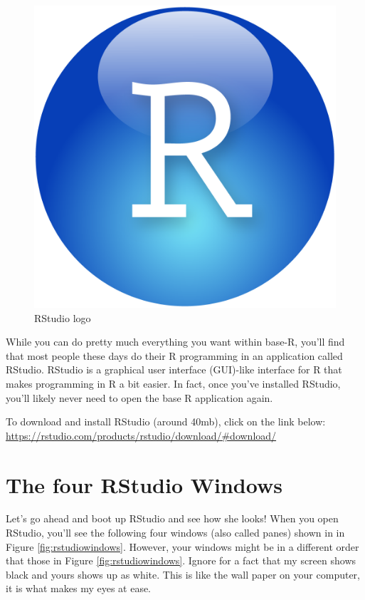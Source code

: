 \documentclass[
]{book}
\begin{document}
\begin{figure}

{\centering \includegraphics[width=0.4\linewidth]{images/chapter-1/RStudio} 

}

\caption{RStudio logo}\label{fig:rstudiologo}
\end{figure}

While you can do pretty much everything you want within base-R, you'll find that most people these days do their R programming in an application called RStudio. RStudio is a graphical user interface (GUI)-like interface for R that makes programming in R a bit easier. In fact, once you've installed RStudio, you'll likely never need to open the base R application again.

To download and install RStudio (around 40mb), click on the link below: \href{https://rstudio.com/products/rstudio/download/\#download}{https://rstudio.com/products/rstudio/download/\#download/}

\hypertarget{INSTALL-GET-FAMILIAR}{%
\section{The four RStudio Windows}\label{INSTALL-GET-FAMILIAR}}

Let's go ahead and boot up RStudio and see how she looks! When you open RStudio, you'll see the following four windows (also called panes) shown in in Figure \ref{fig:rstudiowindows}. However, your windows might be in a different order that those in Figure \ref{fig:rstudiowindows}. Ignore for a fact that my screen shows black and yours shows up as white. This is like the wall paper on your computer, it is what makes my eyes at ease.
\end{document}

